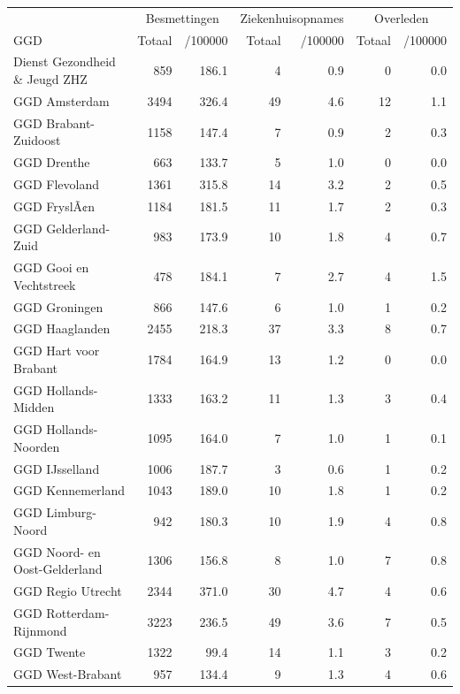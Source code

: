 \documentclass[
  english,
  man,floatsintext]{apa6}
\begin{document}
\begin{table}
\centering\begingroup\fontsize{10}{12}\selectfont

\begin{threeparttable}
\begin{tabular}{lrrrrrr}
\toprule
\multicolumn{1}{c}{ } & \multicolumn{2}{c}{Besmettingen} & \multicolumn{2}{c}{Ziekenhuisopnames} & \multicolumn{2}{c}{Overleden} \\
\cmidrule(l{3pt}r{3pt}){2-3} \cmidrule(l{3pt}r{3pt}){4-5} \cmidrule(l{3pt}r{3pt}){6-7}
GGD & Totaal & /100000 & Totaal & /100000 & Totaal & /100000\\
\midrule
Dienst Gezondheid \& Jeugd ZHZ & 859 & 186.1 & 4 & 0.9 & 0 & 0.0\\
GGD Amsterdam & 3494 & 326.4 & 49 & 4.6 & 12 & 1.1\\
GGD Brabant-Zuidoost & 1158 & 147.4 & 7 & 0.9 & 2 & 0.3\\
GGD Drenthe & 663 & 133.7 & 5 & 1.0 & 0 & 0.0\\
GGD Flevoland & 1361 & 315.8 & 14 & 3.2 & 2 & 0.5\\
GGD FryslÃ¢n & 1184 & 181.5 & 11 & 1.7 & 2 & 0.3\\
GGD Gelderland-Zuid & 983 & 173.9 & 10 & 1.8 & 4 & 0.7\\
GGD Gooi en Vechtstreek & 478 & 184.1 & 7 & 2.7 & 4 & 1.5\\
GGD Groningen & 866 & 147.6 & 6 & 1.0 & 1 & 0.2\\
GGD Haaglanden & 2455 & 218.3 & 37 & 3.3 & 8 & 0.7\\
GGD Hart voor Brabant & 1784 & 164.9 & 13 & 1.2 & 0 & 0.0\\
GGD Hollands-Midden & 1333 & 163.2 & 11 & 1.3 & 3 & 0.4\\
GGD Hollands-Noorden & 1095 & 164.0 & 7 & 1.0 & 1 & 0.1\\
GGD IJsselland & 1006 & 187.7 & 3 & 0.6 & 1 & 0.2\\
GGD Kennemerland & 1043 & 189.0 & 10 & 1.8 & 1 & 0.2\\
GGD Limburg-Noord & 942 & 180.3 & 10 & 1.9 & 4 & 0.8\\
GGD Noord- en Oost-Gelderland & 1306 & 156.8 & 8 & 1.0 & 7 & 0.8\\
GGD Regio Utrecht & 2344 & 371.0 & 30 & 4.7 & 4 & 0.6\\
GGD Rotterdam-Rijnmond & 3223 & 236.5 & 49 & 3.6 & 7 & 0.5\\
GGD Twente & 1322 & 99.4 & 14 & 1.1 & 3 & 0.2\\
GGD West-Brabant & 957 & 134.4 & 9 & 1.3 & 4 & 0.6\\

\end{tabular}
\end{threeparttable}
\end{table}
\end{document}
